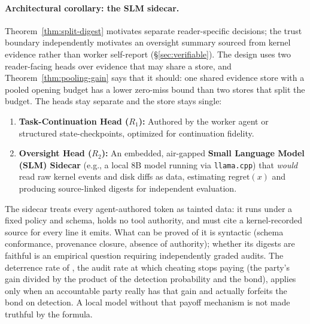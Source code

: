 \documentclass[11pt,a4paper]{article}
\theoremstyle{definition}
\theoremstyle{plain}
\begin{document}
\paragraph{Architectural corollary: the SLM sidecar.}
Theorem~\ref{thm:split-digest} motivates separate reader-specific decisions;
the trust boundary independently motivates an oversight summary sourced from
kernel evidence rather than worker self-report (\S\ref{sec:verifiable}).
The design uses two reader-facing heads over evidence that may share a store,
and Theorem~\ref{thm:pooling-gain} says that it should: one shared evidence
store with a pooled opening budget has a lower zero-miss bound than two stores
that split the budget. The heads stay separate and the store stays single:
\begin{enumerate}[leftmargin=1.4em,itemsep=1pt]
\item \textbf{Task-Continuation Head ($R_1$):}
\pdstatus{\Designed}{}
Authored by the worker agent or structured state-checkpoints, optimized for continuation fidelity.
\item \textbf{Oversight Head ($R_2$):}
An embedded, air-gapped \textbf{Small Language Model (SLM) Sidecar} (e.g., a local 8B model running via \texttt{llama.cpp}) that \emph{would} read raw kernel events and disk diffs as data, estimating $\mathrm{regret}(x)$ and producing source-linked digests for independent evaluation.
\end{enumerate}
\noindent The sidecar treats every agent-authored token as tainted data: it runs
under a fixed policy and schema, holds no tool authority, and must cite a
kernel-recorded source for every line it emits. What can be proved of it is
syntactic (schema conformance, provenance closure, absence of authority); whether
its digests are faithful is an empirical question requiring independently graded audits.
The deterrence rate of , the audit rate
at which cheating stops paying (the party's gain divided by the product of the
detection probability and the bond), applies only when an accountable
party really has that gain and actually forfeits the bond on detection.
A local model without that payoff mechanism is not made truthful by the formula.
\end{document}
